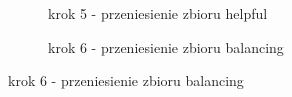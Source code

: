 \begin{figure}[h]
\begin{subfigure}{.5\textwidth}
    \centering
    \caption[short]{krok 5 - przeniesienie zbioru helpful}
\end{subfigure}
\begin{subfigure}{.5\textwidth}
    \centering
    \caption[short]{krok 6 - przeniesienie zbioru balancing}
\end{subfigure}%


\end{figure}
